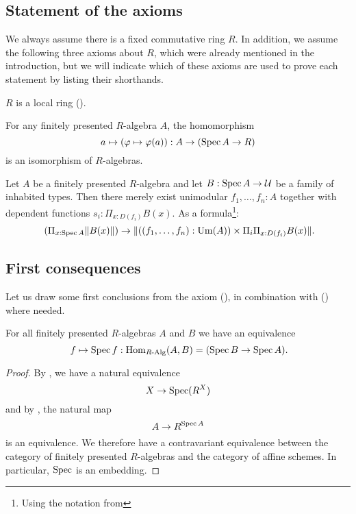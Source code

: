 \subsection{Statement of the axioms}%
\label{statement-of-axioms}

We always assume there is a fixed commutative ring $R$.
In addition, we assume the following three axioms about $R$,
which were already mentioned in the introduction,
but we will indicate which of these axioms are used to prove each statement
by listing their shorthands.

\begin{axiom}[Loc]%
  \label{loc}
  $R$ is a local ring ().
\end{axiom}

\begin{axiom}[SQC]%
  \label{sqc}
  For any finitely presented $R$-algebra $A$, the homomorphism
  \[ a \mapsto (\varphi\mapsto \varphi(a)) : A \to (\operatorname{Spec} A \to R)\]
  is an isomorphism of $R$-algebras.
\end{axiom}

\begin{axiom}[Z-choice]%
  \label{Z-choice}
  Let $A$ be a finitely presented $R$-algebra
  and let $B : \operatorname{Spec} A \to \mathcal{U}$ be a family of inhabited types.
  Then there merely exist unimodular $f_1, \dots, f_n : A$
  together with dependent functions $s_i : \Pi_{x : D(f_i)} B(x)$.
  As a formula\footnote{Using the notation from }:
  \[ (\Pi_{x : \Spec A} \propTrunc{B(x)}) \to
     \propTrunc{ ((f_1,\dots,f_n):\Um(A)) \times
      \Pi_i \Pi_{x : D(f_i)} B(x) }
     \rlap{.}
  \]
\end{axiom}

\subsection{First consequences}

Let us draw some first conclusions from the axiom (),
in combination with () where needed.

\begin{proposition}%
  \label{spec-embedding}
  For all finitely presented $R$-algebras $A$ and $B$ we have an equivalence
  \[
    f\mapsto \Spec f : \Hom_{\Alg{R}}(A,B) = (\Spec B \to \Spec A)
    \rlap{.}
  \]
\end{proposition}

\begin{proof}
  By , we have a natural equivalence
  \[
    X\to \operatorname{Spec} (R^X)
  \]
  and by , the natural map
  \[
    A\to R^{\operatorname{Spec} A}
  \]
  is an equivalence.
  We therefore have a contravariant equivalence between
  the category of finitely presented $R$-algebras
  and the category of affine schemes.
  In particular, $\operatorname{Spec}$ is an embedding.
\end{proof}

